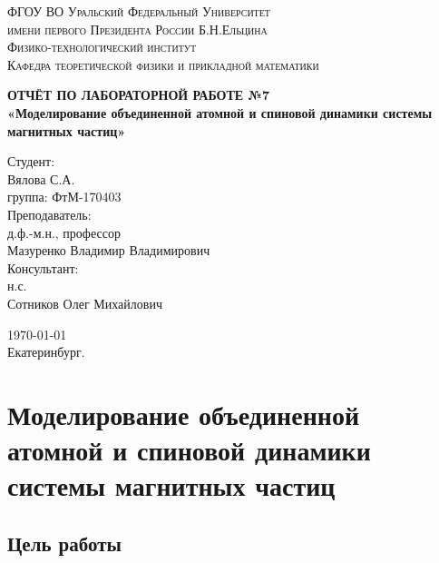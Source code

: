 \documentclass[14pt,a4paper,report]{ncc}
\begin{document}
\def\contentsname{Содержание}

\begin{titlepage}
\begin{center}
\textsc{ФГОУ ВО Уральский Федеральный Университет \\ имени первого Президента России Б.Н.Ельцина\\[5mm]
Физико-технологический институт\\[2mm]
Кафедра теоретической физики и прикладной математики}

\vfill

\textbf{ОТЧЁТ ПО ЛАБОРАТОРНОЙ РАБОТЕ №7\\[3mm]
«Моделирование объединенной атомной и спиновой динамики системы магнитных частиц»\\[6mm]
}
\end{center}

\hfill
\begin{minipage}{.5\textwidth}
Студент:\\[2mm] 
Вялова С.А.\\
группа: ФтМ-170403 \\[5mm]

Преподаватель:\\[2mm] 
д.ф.-м.н., профессор\\
Мазуренко Владимир Владимирович\\[5mm]

Консультант:\\[2mm] 
н.с.\\
Сотников Олег Михайлович\\

\end{minipage}%
\vfill
\begin{center}
\today  \\
 Екатеринбург.
\end{center}
\end{titlepage}

\tableofcontents
\newpage
\chapter{Моделирование объединенной атомной и спиновой динамики системы магнитных частиц}
\section{Цель работы}
\end{document}

